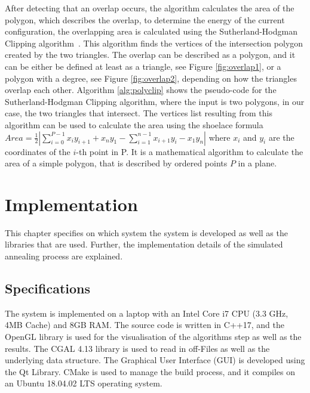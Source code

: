 \documentclass[draft,final]{vutinfth} %
\begin{document}
After detecting that an overlap occurs, the algorithm calculates the area of the polygon, which describes the overlap, to determine the energy of the current configuration, the overlapping area is calculated using the Sutherland-Hodgman Clipping algorithm~\cite{sutherland1974reentrant}. This algorithm finds the vertices of the intersection polygon created by the two triangles. The overlap can be described as a polygon, and it can be either be defined at least as a triangle, see Figure \ref{fig:overlap1}, or a polygon with a degree, see Figure \ref{fig:overlap2}, depending on how the triangles overlap each other. Algorithm \ref{alg:polyclip} shows the pseudo-code for the Sutherland-Hodgman Clipping algorithm, where the input is two polygons, in our case, the two triangles that intersect. The vertices list resulting from this algorithm can be used to calculate the area using the shoelace formula~\cite{vslapak2017automated} $Area = \frac{1}{2} \left| \sum_{i=0}^{P-1} x_iy_{i+1} + x_ny_1 - \sum_{i=1}^{n-1} x_{i+1}y_i - x_1y_n \right|$ where $x_i$ and $y_i$ are the coordinates of the $i$-th point in P. It is a mathematical algorithm to calculate the area of a simple polygon, that is described by ordered points $P$ in a plane.

\chapter{Implementation}
\label{chap:Implementation}
This chapter specifies on which system the system is developed as well as the libraries that are used. Further, the implementation details of the simulated annealing process are explained.

\section{Specifications}
The system is implemented on a laptop with an Intel Core i7 CPU (3.3 GHz, 4MB Cache) and 8GB RAM. The source code is written in C++17, and the OpenGL library is used for the visualisation of the algorithms step as well as the results. The CGAL 4.13 library is used to read in off-Files as well as the underlying data structure. The Graphical User Interface (GUI) is developed using the Qt Library. CMake is used to manage the build process, and it compiles on an Ubuntu 18.04.02 LTS operating system.
\end{document}
